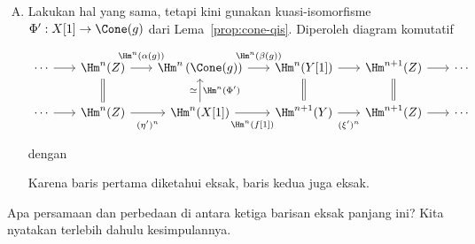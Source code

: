 \begin{enumerate}[(A)]
	\item Lakukan hal yang sama, tetapi kini gunakan kuasi-isomorfisme
	$\Phi':X[1]\to\Cone(g)$ dari Lema~\ref{prop:cone-qis}. Diperoleh diagram
	komutatif
	\[\begin{tikzcd}[column sep=scriptsize]
		\cdots \arrow[r] & \Hm^n(Z) \arrow[r, "{\Hm^n(\alpha(g))}" inner sep=0.6em] & \Hm^n\left( \Cone(g) \right) \arrow[r, "{\Hm^n(\beta(g))}" inner sep=0.6em] & \Hm^n(Y[1]) \arrow[r] & \Hm^{n+1}(Z) \arrow[r] & \cdots \\
		\cdots \arrow[r] & \Hm^n(Z) \arrow[r, "{(\eta')^n}"' inner sep=0.6em] \arrow[equal, u] & \Hm^n(X[1]) \arrow[r, "{\Hm^n(f[1])}"' inner sep=0.6em] \arrow[u, "{\Hm^n(\Phi')}"', "\simeq"] & \Hm^{n+1}(Y) \arrow[r, "{(\xi')^n}"' inner sep=0.6em] \arrow[equal, u] & \Hm^{n+1}(Z) \arrow[r] \arrow[equal, u] & \cdots
	\end{tikzcd}\]
	dengan
	Karena baris pertama diketahui eksak, baris kedua juga eksak.
\end{enumerate}

Apa persamaan dan perbedaan di antara ketiga barisan eksak panjang ini? Kita
nyatakan terlebih dahulu kesimpulannya.

